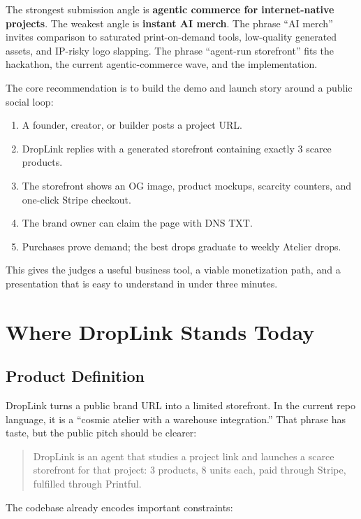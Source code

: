 \documentclass[11pt]{article}
\begin{document}
The strongest submission angle is \textbf{agentic commerce for internet-native projects}. The weakest angle is \textbf{instant AI merch}. The phrase ``AI merch'' invites comparison to saturated print-on-demand tools, low-quality generated assets, and IP-risky logo slapping. The phrase ``agent-run storefront'' fits the hackathon, the current agentic-commerce wave, and the implementation.

The core recommendation is to build the demo and launch story around a public social loop:

\begin{enumerate}
  \item A founder, creator, or builder posts a project URL.
  \item DropLink replies with a generated storefront containing exactly 3 scarce products.
  \item The storefront shows an OG image, product mockups, scarcity counters, and one-click Stripe checkout.
  \item The brand owner can claim the page with DNS TXT.
  \item Purchases prove demand; the best drops graduate to weekly Atelier drops.
\end{enumerate}

This gives the judges a useful business tool, a viable monetization path, and a presentation that is easy to understand in under three minutes.

\section{Where DropLink Stands Today}

\subsection{Product Definition}

DropLink turns a public brand URL into a limited storefront. In the current repo language, it is a ``cosmic atelier with a warehouse integration.'' That phrase has taste, but the public pitch should be clearer:

\begin{quote}
  DropLink is an agent that studies a project link and launches a scarce storefront for that project: 3 products, 8 units each, paid through Stripe, fulfilled through Printful.
\end{quote}

The codebase already encodes important constraints:
\end{document}
